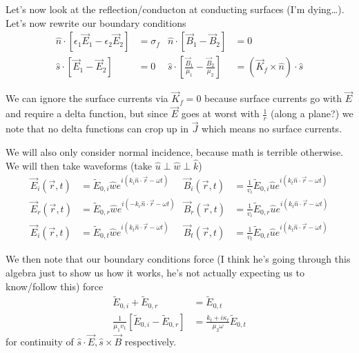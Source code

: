 \documentclass[10pt]{report}
\begin{document}
Let's now look at the reflection/conducton at conducting surfaces (I'm dying\dots). Let's now rewrite our boundary conditions
\begin{align}
    \hat{n} \cdot \left[ \epsilon_1 \vec{E}_1 - \epsilon_2 \vec{E}_2 \right] &= \sigma_f & \hat{n} \cdot \left[ \vec{B}_1 - \vec{B}_2 \right] &= 0\\
    \hat{s} \cdot \left[ \vec{E}_1 - \vec{E}_2 \right] &= 0 & \hat{s} \cdot \left[ \frac{\vec{B}_1}{\mu_1} - \frac{\vec{B}_2}{\mu_2} \right] &= (\vec{K}_f \times \hat{n})\cdot\hat{s}
\end{align}

We can ignore the surface currents via $\vec{K}_f = 0$ because surface currents go with $\vec{E}$ and require a delta function, but since $\vec{E}$ goes at worst with $\frac{1}{r}$ (along a plane?) we note that no delta functions can crop up in $\vec{J}$ which means no surface currents.

We will also only consider normal incidence, because math is terrible otherwise. We will then take waveforms (take $\hat{u} \perp \hat{w} \perp \hat{k}$)
\begin{align}
    \vec{E}_i (\vec{r},t) &= \tilde{E}_{0,i} \hat{w}e^{i(k_i \hat{n} \cdot \vec{r} - \omega t)} &     \vec{B}_i(\vec{r},t) &= \frac{1}{v_i}\tilde{E}_{0,i}\hat{u}e^{i(k_t \hat{n} \cdot \vec{r} - \omega t)}\\
    \vec{E}_r (\vec{r},t) &= \tilde{E}_{0,r} \hat{w}e^{i(-k_r \hat{n} \cdot \vec{r} - \omega t)} &    \vec{B}_r(\vec{r},t) &= \frac{1}{v_i}\tilde{E}_{0,r}\hat{u}e^{i(k_t \hat{n} \cdot \vec{r} - \omega t)}\\
    \vec{E}_i (\vec{r},t) &= \tilde{E}_{0,t} \hat{w}e^{i(k_t \hat{n} \cdot \vec{r} - \omega t)}&     \vec{B}_t(\vec{r},t) &= \frac{1}{v_t}\tilde{E}_{0,t}\hat{u}e^{i(k_t \hat{n} \cdot \vec{r} - \omega t)}
\end{align}

We then note that our boundary conditions force (I think he's going through this algebra just to show us how it works, he's not actually expecting us to know/follow this) force
\begin{align}
    \tilde{E}_{0,i} + \tilde{E}_{0,r} &= \tilde{E}_{0,t}\\
    \frac{1}{\mu_1v_1}\left[ \tilde{E}_{0,i} - \tilde{E}_{0,r} \right] &= \frac{k_t + i\kappa_t}{\mu_2 \omega}\tilde{E}_{0,t}
\end{align}
for continuity of $\hat{s} \cdot \vec{E}, \hat{s} \times \vec{B}$ respectively.
\end{document}
